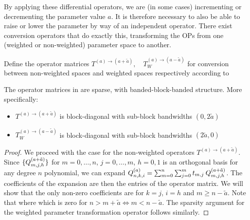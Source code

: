 By applying these differential operators, we are (in some cases) incrementing or decrementing the parameter value $a$. It is therefore necessary to also be able to raise or lower the parameter by way of an independent operator. There exist conversion  operators that do exactly this, transforming the OPs from one (weighted or non-weighted) parameter space to another.
\begin{definition}\label{def:sc:parametertransformationoperators}
Define the operator matrices $T^{(a)\to(a+\tilde a)}, \quad T_W^{(a)\to(a-\tilde a)}$ for conversion between non-weighted spaces and weighted spaces respectively according to
\end{definition}

\begin{lemma}\label{lemma:sc:sparsityofparametertransformationoperators}
The operator matrices in  are sparse, with banded-block-banded structure. More specifically:
\begin{itemize}
	\item $T^{(a)\to(a+\tilde a)}$ is block-diagonal with sub-block bandwidths $(0,2\tilde a)$
	\item $T_W^{(a)\to(a-\tilde a)}$ is block-diagonal with sub-block bandwidths $(2\tilde a, 0)$
\end{itemize}
\end{lemma}

\begin{proof}
We proceed with the case for the non-weighted operators $T^{(a)\to(a+\tilde a)}$. Since $\{Q_{m,j,h}^{(a+\tilde{a})}\}$ for $m = 0,\dots,n$, $j = 0,\dots,m$, $h = 0,1$ is an orthogonal basis for any degree $n$ polynomial, we can expand $Q_{n,k,i}^{(a)} = \sum_{m=0}^{n} \sum_{j=0}^m t_{m,j} \: Q_{m,j,h}^{(a+\tilde{a})}$. The coefficients of the expansion are then the entries of the operator matrix. We will show that the only non-zero coefficients are for $k = j$, $i = h$ and $m \ge  n - \tilde a$. Note that
where
which is zero for $n > m + \tilde a \iff m < n - \tilde a$. The sparsity argument for the weighted parameter transformation operator follows similarly.
\end{proof}

